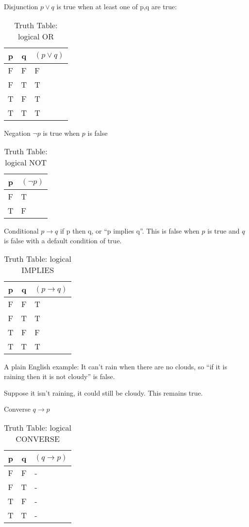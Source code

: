 Disjunction $p \lor q$ is true when at least one of p,q are true:
\begin{table}[!htb]
\label{tab:TruthTableOR}
\begin{tabularx}{\linewidth}{| c | c | X |} \hline
  p & q & $(p \lor q)$ \\ \hline \hline
  F & F & F \\ \hline
  F & T & T \\ \hline
  T & F & T \\ \hline
  T & T & T \\ \hline
\end{tabularx}
\caption{Truth Table: logical OR}
\end{table}

Negation $\lnot p$ is true when $p$ is false
\begin{table}[!htb]
\label{tab:TruthTableNOT}
\begin{tabularx}{\linewidth}{| c | X |} \hline
  p & $(\lnot p)$ \\ \hline \hline
  F & T \\ \hline
  T & F\\ \hline
\end{tabularx}
\caption{Truth Table: logical NOT}
\end{table}

Conditional $p \to q$ if p then q, or ``p implies q''. This is false when
$p$ is true and $q$ is false with a default condition of true.

\begin{table}[!htb]
\label{tab:TruthTableIMPLIES}
\begin{tabularx}{\linewidth}{| c | c | X |} \hline
  p & q & $(p \to q)$ \\ \hline \hline
  F & F & T \\ \hline
  F & T & T \\ \hline
  T & F & F \\ \hline
  T & T & T \\ \hline
\end{tabularx}
\caption{Truth Table: logical IMPLIES}
\end{table}

A plain English example: It can't rain when there are no clouds, so ``if it is
raining then it is not cloudy'' is false.

Suppose it isn't raining, it could still be cloudy. This remains true.

Converse $q \to p$
\begin{table}[!htb]
\label{tab:TruthTableCONVERSE}
\begin{tabularx}{\linewidth}{| c | c | X |} \hline
  p & q & $(q \to p)$ \\ \hline \hline
  F & F & - \\ \hline
  F & T & - \\ \hline
  T & F & - \\ \hline
  T & T & - \\ \hline
\end{tabularx}
\caption{Truth Table: logical CONVERSE}
\end{table}

